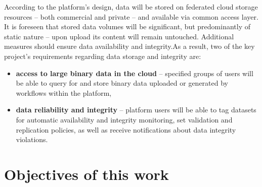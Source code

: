 According to the platform's design, data will be stored on federated cloud storage resources --
both commercial and private -- and available via common access layer. It is foreseen that stored
data volumes will be significant, but predominantly of static nature -- upon upload its content will
remain untouched. Additional measures should ensure data availability and integrity.As a result, two
of the key project's requirements regarding data storage and integrity are:

\begin{itemize}
\item \textbf{access to large binary data in the cloud} -- specified groups of users will
be able to query for and store binary data uploaded or generated by workflows within the platform, 
\item \textbf{data reliability and integrity} -- platform users will be able to tag datasets
for automatic availability and integrity monitoring, set validation and replication policies,
as well as receive notifications about data integrity violations.
\end{itemize}




\section{Objectives of this work}
